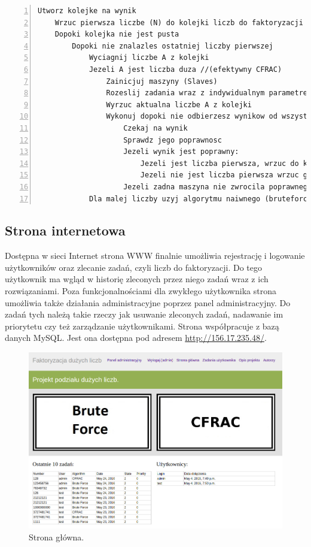 \documentclass{article}
\begin{document}
\begin{lstlisting}[caption=Sekwencja instrukcji algorytmu CFRAC,numbers=left]
    Utworz kolejke na wynik
    Wrzuc pierwsza liczbe (N) do kolejki liczb do faktoryzacji
    Dopoki kolejka nie jest pusta 
        Dopoki nie znalazles ostatniej liczby pierwszej
            Wyciagnij liczbe A z kolejki 
            Jezeli A jest liczba duza //(efektywny CFRAC) 
                Zainicjuj maszyny (Slaves) 
                Rozeslij zadania wraz z indywidualnym parametrem K 
                Wyrzuc aktualna liczbe A z kolejki 
                Wykonuj dopoki nie odbierzesz wynikow od wszystkich maszyn 
                    Czekaj na wynik 
                    Sprawdz jego poprawnosc 
                    Jezeli wynik jest poprawny: 
                        Jezeli jest liczba pierwsza, wrzuc do kolejki wynikow
                        Jezeli nie jest liczba pierwsza wrzuc go oraz jego iloraz z liczba A do kolejki liczb do faktoryzacji 
                    Jezeli zadna maszyna nie zwrocila poprawnego wyniku, zmien parametr k i wrzuc z powrotem liczbe A do kolejki liczb do faktoryzacji 
            Dla malej liczby uzyj algorytmu naiwnego (bruteforce)
\end{lstlisting}

\subsection{Strona internetowa}

Dostępna w sieci Internet strona WWW finalnie umożliwia rejestrację i logowanie użytkowników oraz zlecanie zadań, czyli liczb do faktoryzacji. Do tego użytkownik ma wgląd w historię zleconych przez niego zadań wraz z ich rozwiązaniami. Poza funkcjonalnościami dla zwykłego użytkownika strona umożliwia także działania administracyjne poprzez panel administracyjny. Do zadań tych należą takie rzeczy jak usuwanie zleconych zadań, nadawanie im priorytetu czy też zarządzanie użytkownikami. Strona współpracuje z bazą danych MySQL. Jest ona dostępna pod adresem \url{http://156.17.235.48/}.

\newpage
\begin{figure}[h!]
    \includegraphics[width=\linewidth]{mainpage.png}
    \caption{Strona główna.}
    \label{fig:mainpagescr}
\end{figure}
\end{document}
